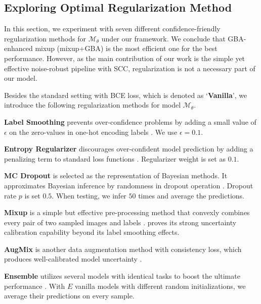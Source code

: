 \documentclass[runningheads]{llncs}
\begin{document}
\subsection{Exploring Optimal Regularization Method}
\label{S:exp-regular}
In this section, we experiment with seven different confidence-friendly regularization methods for $\mathcal{M}_\theta$ under our framework. We conclude that GBA-enhanced mixup (mixup+GBA) is the most efficient one for the best performance. However, as the main contribution of our work is the simple yet effective noise-robust pipeline with SCC, regularization is not a necessary part of our model.

    
Besides the standard setting with BCE loss, which is denoted as `\textbf{Vanilla}', we introduce the following  regularization methods for model $\mathcal{M}_\theta$.

\textbf{Label Smoothing} prevents over-confidence problems by adding a small value of $\epsilon$ on the zero-values in one-hot encoding labels \cite{szegedy2016rethinking}. We use $\epsilon=0.1$.

\textbf{Entropy Regularizer} discourages over-confident model prediction by adding a penalizing term to standard loss functions \cite{pereyra2017regularizing}. Regularizer weight is set as $0.1$.

\textbf{MC Dropout} is selected as the representation of Bayesian methods. It approximates Bayesian inference by randomness in dropout operation \cite{gal2016dropout}. Dropout rate $p$ is set $0.5$. When testing, we infer $50$ times and average the predictions.

\textbf{Mixup} is a simple but effective pre-processing method that convexly combines every pair of two sampled images and labels \cite{zhang2018mixup}. 
\cite{thulasidasan2019mixup} proves its strong uncertainty calibration capability beyond its label smoothing effects.

\textbf{AugMix} is another data augmentation method with consistency loss, which produces well-calibrated model uncertainty \cite{hendrycks2020augmix}.

\textbf{Ensemble} utilizes several models with identical tasks to boost the ultimate performance \cite{dietterich2000ensemble}. With $E$ vanilla models with different random initializations, we average their predictions on every sample.
\end{document}
